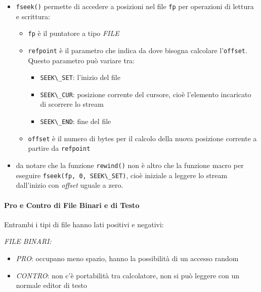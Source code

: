 \documentclass[
  paper=a4,
  oneside  ,captions=tableheading
]{scrbook}
\newcommand{\passthrough}[1]{#1}
\providecommand{\tightlist}{%
  \setlength{\itemsep}{0pt}\setlength{\parskip}{0pt}}
\begin{document}
\begin{itemize}
\tightlist
\item
  \passthrough{\lstinline!fseek()!} permette di accedere a posizioni nel
  file \passthrough{\lstinline!fp!} per operazioni di lettura e
  scrittura:

  \begin{itemize}
  \tightlist
  \item
    \passthrough{\lstinline!fp!} è il puntatore a tipo \emph{FILE}
  \item
    \passthrough{\lstinline!refpoint!} è il parametro che indica da dove
    bisogna calcolare l'\passthrough{\lstinline!offset!}. Questo
    parametro può variare tra:

    \begin{itemize}
    \tightlist
    \item
      \passthrough{\lstinline!SEEK\_SET!}: l'inizio del file
    \item
      \passthrough{\lstinline!SEEK\_CUR!}: posizione corrente del
      cursore, cioè l'elemento incaricato di scorrere lo stream
    \item
      \passthrough{\lstinline!SEEK\_END!}: fine del file
    \end{itemize}
  \item
    \passthrough{\lstinline!offset!} è il numero di bytes per il calcolo
    della nuova posizione corrente a partire da
    \passthrough{\lstinline!refpoint!}
  \end{itemize}
\item
  da notare che la funzione \passthrough{\lstinline!rewind()!} non è
  altro che la funzione macro per eseguire
  \passthrough{\lstinline!fseek(fp, 0, SEEK\_SET)!}, cioè iniziale a
  leggere lo stream dall'inizio con \emph{offset} uguale a zero.
\end{itemize}

\hypertarget{pro-e-contro-di-file-binari-e-di-testo}{%
\paragraph{Pro e Contro di File Binari e di
Testo}\label{pro-e-contro-di-file-binari-e-di-testo}}

Entrambi i tipi di file hanno lati positivi e negativi:

\emph{FILE BINARI:}

\begin{itemize}
\tightlist
\item
  \emph{PRO}: occupano meno spazio, hanno la possibilità di un accesso
  random
\item
  \emph{CONTRO}: non c'è portabilità tra calcolatore, non si può leggere
  con un normale editor di testo
\end{itemize}
\end{document}
